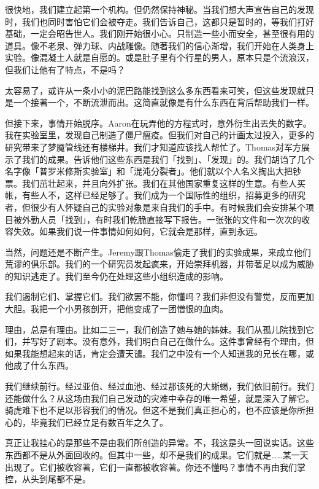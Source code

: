很快地，我们建立起第一个机构。但仍然保持神秘。当我们想大声宣告自己的发现时，我们也同时害怕它们会被夺走。我们告诉自己，这都只是暂时的，等我们打好基础，一定会昭告世人。我们刚开始很小心。只制造一些小而安全，甚至很有用的道具。像不老泉、弹力球、内战雕像。随著我们的信心渐增，我们开始在人类身上实验。像混凝土人就是自愿的。或是肚子里有个行星的男人，原本只是个流浪汉，但我们让他有了特点，不是吗？

太容易了，或许从一条小小的泥巴路能找到这么多东西看来可笑，但这些发现就只是一个接著一个，不断流泄而出。这简直就像是有什么东西在背后帮助我们一样。

但接下来，事情开始脱序。Aaron在玩弄他的方程式时，意外衍生出丟失的数字。我在实验室里，发现自己制造了僵尸瘟疫。但我们对自己的计画太过投入，更多的研究带来了梦魇管线还有楼梯井。我们才知道应该找人帮忙了。Thomas对军方展示了我们的成果。告诉他们这些东西是我们「找到」、「发现」的。我们胡诌了几个名字像「普罗米修斯实验室」和「混沌分裂者」。他们就以个人名义掏出大把钞票。我们茁壮起来，并且向外扩张。我们在其他国家重复这样的生意。有些人买帐，有些人不，这样已经足够了。我们成为一个国际性的组织，招募更多的研究者，但很少有人怀疑自己的实验对象是来自我们的手中。有时候我们会安排某个项目被外勤人员「找到」，有时我们乾脆直接写下报告。一张张的文件和一次次的收容失效。如果我们说一件事情如何如何，它就会是那样，直到永远。

当然，问题还是不断产生。Jeremy跟Thomas偷走了我们的实验成果，来成立他们荒谬的俱乐部。我们的一个研究员发起疯来，开始崇拜机器，并带著足以成为威胁的知识逃走了。我们至今仍在处理这些小组织造成的影响。

我们遏制它们、掌握它们。我们欲罢不能，你懂吗？我们非但没有警觉，反而更加大胆。我把一个小男孩剖开，把他变成了一团憎恨的血肉。

理由，总是有理由。比如二三一，我们创造了她与她的姊妹。我们从孤儿院找到它们，并写好了剧本。没有意外，我们明白自己在做什么。这件事曾经有个理由，但如果我能想起来的话，肯定会遭天谴。我们之中没有一个人知道我的兄长在哪，或他成了什么东西。

我们继续前行。经过亚伯、经过血池、经过那该死的大蜥蜴，我们依旧前行。我们还能做什么？从这场由我们自己发动的灾难中幸存的唯一希望，就是深入了解它。骑虎难下也不足以形容我们的情况。但这不是我们真正担心的，也不应该是你所担心的，毕竟我们已经立足有数百年之久了。

真正让我挂心的是那些不是由我们所创造的异常。不，我这是头一回说实话。这些东西都不是从外面回收的。但其中一些，却不是我们的成果。它们就是……某一天出现了。它们被收容著，它们一直都被收容著。你还不懂吗？事情不再由我们掌控，从头到尾都不是。
